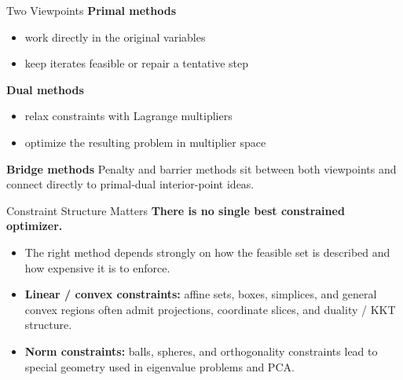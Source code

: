 \documentclass[11pt,compress,t,notes=noshow, xcolor=table]{beamer}
\begin{document}
\begin{framev}[fs=footnotesize]{Two Viewpoints}
\textbf{Primal methods}
\begin{itemize}
\item work directly in the original variables
\item keep iterates feasible or repair a tentative step
\end{itemize}
\textbf{Dual methods}
\begin{itemize}
\item relax constraints with Lagrange multipliers
\item optimize the resulting problem in multiplier space
\end{itemize}
\textbf{Bridge methods}
Penalty and barrier methods sit between both viewpoints and connect directly to primal-dual interior-point ideas.
\end{framev}


\begin{framev}[fs=footnotesize]{Constraint Structure Matters}
\textbf{There is no single best constrained optimizer.}
\begin{itemize}
\item The right method depends strongly on how the feasible set is described and how expensive it is to enforce.
\item \textbf{Linear / convex constraints:} affine sets, boxes, simplices, and general convex regions often admit projections, coordinate slices, and duality / KKT structure.
\item \textbf{Norm constraints:} balls, spheres, and orthogonality constraints lead to special geometry used in eigenvalue problems and PCA.
\end{itemize}
\end{framev}

\endlecture
\end{document}
